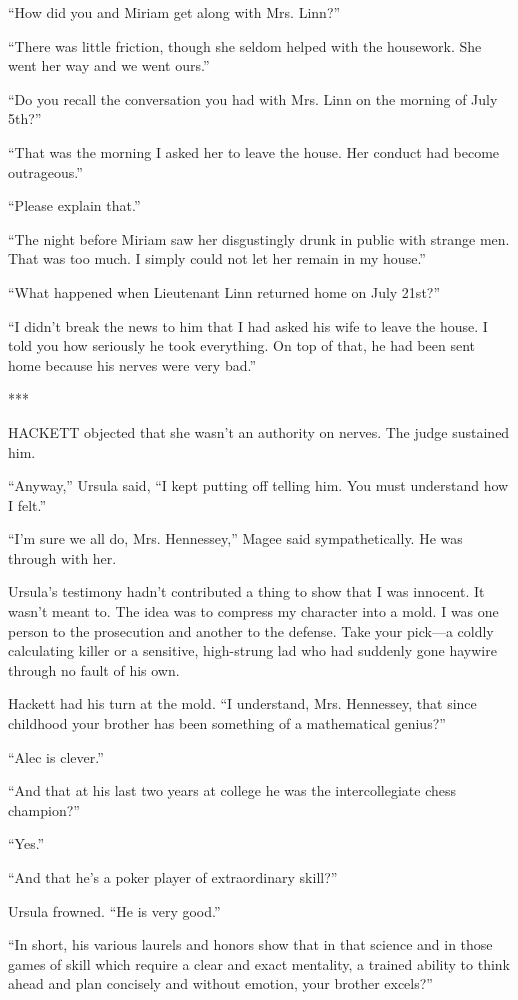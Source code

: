 \documentclass{novel}
\begin{document}
{“How did you and Miriam get along with Mrs. Linn?”

“There was little friction, though she seldom helped with the housework. She went her way and we went ours.”

“Do you recall the conversation you had with Mrs. Linn on the morning of July 5th?”

“That was the morning I asked her to leave the house. Her conduct had become outrageous.”

“Please explain that.”

“The night before Miriam saw her disgustingly drunk in public with strange men. That was too much. I simply could not let her remain in my house.”

“What happened when Lieutenant Linn returned home on July 21st?”

“I didn’t break the news to him that I had asked his wife to leave the house. I told you how seriously he took everything. On top of that, he had been sent home because his nerves were very bad.”

***

HACKETT objected that she wasn’t an authority on nerves. The judge sustained him.

“Anyway,” Ursula said, “I kept putting off telling him. You must understand how I felt.”

“I’m sure we all do, Mrs. Hennessey,” Magee said sympathetically. He was through with her.

Ursula’s testimony hadn’t contributed a thing to show that I was innocent. It wasn’t meant to. The idea was to compress my character into a mold. I was one person to the prosecution and another to the defense. Take your pick—a coldly calculating killer or a sensitive, high-strung lad who had suddenly gone haywire through no fault of his own.

Hackett had his turn at the mold. “I understand, Mrs. Hennessey, that since childhood your brother has been something of a mathematical genius?”

“Alec is clever.”

“And that at his last two years at college he was the intercollegiate chess champion?”

“Yes.”

“And that he’s a poker player of extraordinary skill?”

Ursula frowned. “He is very good.”

“In short, his various laurels and honors show that in that science and in those games of skill which require a clear and exact mentality, a trained ability to think ahead and plan concisely and without emotion, your brother excels?”

}
\end{document}
